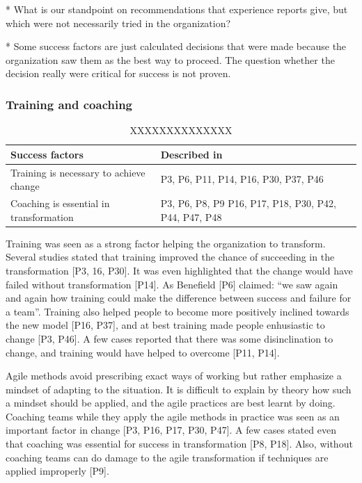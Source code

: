\documentclass[preprint,authoryear,12pt]{elsarticle}
\begin{document}
* What is our standpoint on recommendations that experience reports give, but
  which were not necessarily tried in the organization?

* Some success factors are just calculated decisions that were made because
  the organization saw them as the best way to proceed. The question whether
  the decision really were critical for success is not proven. 

\subsubsection{Training and coaching}

\begin{table}[h]
    \centering
    \begin{tabular}{ >{\raggedright\arraybackslash}p{}
                     >{\raggedright\arraybackslash}p{} }
        \toprule
        Success factors  &  Described in \\
        \midrule
        Training is necessary to achieve change  &
                P3, P6, P11, P14, P16, P30, P37, P46 \\
        Coaching is essential in transformation  &
                P3, P6, P8, P9 P16, P17, P18, P30, P42, P44, P47, P48  \\
        \bottomrule
    \end{tabular}
    \caption{XXXXXXXXXXXXXX}
    \label{table:success_NN}
\end{table}

Training was seen as a strong factor helping the organization to transform.
Several studies stated that training improved the chance of succeeding in the
transformation [P3, 16, P30]. It was even highlighted that the change would have
failed without transformation [P14]. As Benefield [P6] claimed: ``we saw again
and again how training could make the difference between success and failure for
a team''. Training also helped people to become more positively inclined towards
the new model [P16, P37], and at best training made people enhusiastic to change
[P3, P46]. A few cases reported that there was some disinclination to change,
and training would have helped to overcome [P11, P14].

Agile methods avoid prescribing exact ways of working but rather emphasize a
mindset of adapting to the situation. It is difficult to explain by theory how
such a mindset should be applied, and the agile practices are best learnt by
doing. Coaching teams while they apply the agile methods in practice was seen as
an important factor in change [P3, P16, P17, P30, P47]. A few cases stated even
that coaching was essential for success in transformation [P8, P18]. Also,
without coaching teams can do damage to the agile transformation if techniques
are applied improperly [P9].
\end{document}
